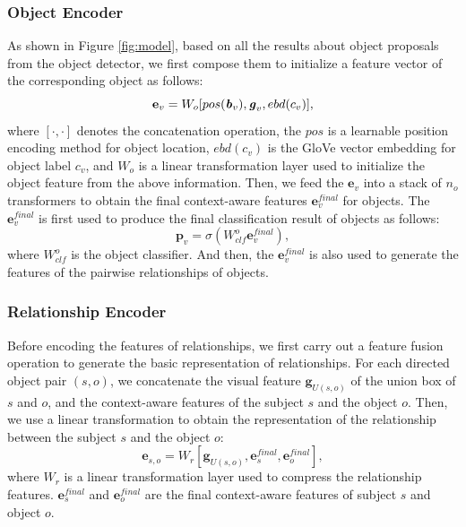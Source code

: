 \subsubsection{Object Encoder}
As shown in Figure \ref{fig:model}, based on all the results about object proposals from the object detector, we first compose them to initialize a feature vector of the corresponding object as follows:
\begin{equation}
	\mathbf{e}_v = W_o[pos(\textbf{\textit{b}}_v),\textbf{\textit{g}}_v, ebd(c_v)],
\end{equation}
where $[\cdot,\cdot]$ denotes the concatenation operation, the $pos$ is a learnable position encoding method for object location, $ebd(c_v)$ is the GloVe vector embedding for object label $c_v$, and $W_o$ is a linear transformation layer used to initialize the object feature from the above information. 
Then, we feed the $\mathbf{e}_v$ into a stack of $n_o$ transformers to obtain the final context-aware features $\mathbf{e}_v^{final}$ for objects. 
The $\mathbf{e}_v^{final}$ is first used to produce the final classification result of objects as follows:
\begin{equation}
    \mathbf{p}_v = \sigma(W_{clf}^{o}\mathbf{e}_v^{final}),
\end{equation}
where $W_{clf}^{o}$ is the object classifier. 
And then, the $\mathbf{e}_v^{final}$ is also used to generate the features of the pairwise relationships of objects.

\subsubsection{Relationship Encoder}
Before encoding the features of relationships, we first carry out a feature fusion operation to generate the basic representation of relationships. For each directed object pair $(s,o)$, we concatenate the visual feature $\mathbf{g}_{U(s,o)}$ of the union box of $s$ and $o$, and the context-aware features of the subject $s$ and the object $o$. Then, we use a linear transformation to obtain the representation of the relationship between the subject $s$ and the object $o$:
\begin{equation}
	\mathbf{e}_{s,o} = W_r[\mathbf{g}_{U(s,o)},\mathbf{e}_s^{final}, \mathbf{e}_o^{final}],
\end{equation}
where $W_r$ is a linear transformation layer used to compress the relationship features. $\mathbf{e}_s^{final}$ and $ \mathbf{e}_o^{final}$ are the final context-aware features of subject $s$ and object $o$.


